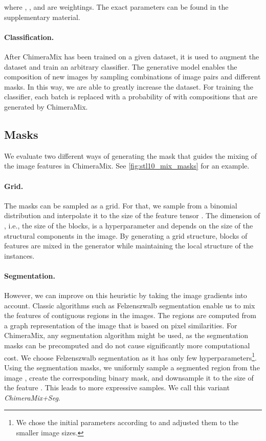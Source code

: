 \documentclass{article}
\newcommand{\methodname}{ChimeraMix\xspace}
\newcommand{\methodnameseg}{ChimeraMix+Seg\xspace}
\newcommand{\textcite}[1]{\citeauthor{#1}\xspace\shortcite{#1}}
\begin{document}
where , , and  are weightings.
The exact parameters can be found in the supplementary material. 


\paragraph{Classification.}
\label{par:classifier}

After \methodname has been trained on a given dataset, it is used to augment the dataset and train an arbitrary classifier. 
The generative model enables the composition of new images by sampling combinations of image pairs and different masks. 
In this way, we are able to greatly increase the dataset. 
For training the classifier, each batch is replaced with a probability of  with compositions that are generated by \methodname.

\subsection{Masks}
\label{subsec:masks}

We evaluate two different ways of generating the mask that guides the mixing of the image features in \methodname.
See \cref{fig:stl10_mix_masks} for an example.

\paragraph{Grid.}
\label{par:grid}

The masks can be sampled as a grid.
For that, we sample  from a binomial distribution  and interpolate it to the size of the feature tensor .
The dimension of , i.e., the size of the blocks, is a hyperparameter and depends on the size of the structural components in the image. 
By generating a grid structure, blocks of features are mixed in the generator while maintaining the local structure of the instances.

\paragraph{Segmentation.}
\label{par:segmentation_masks}

However, we can improve on this heuristic by taking the image gradients into account.
Classic algorithms such as Felzenszwalb segmentation \cite{felzenszwalbEfficientGraphBasedImage2004} enable us to mix the features of contiguous regions in the images.
The regions are computed from a graph representation of the image that is based on pixel similarities.
For \methodname, any segmentation algorithm might be used, as the segmentation masks can be precomputed and do not cause significantly more computational cost.
We choose Felzenszwalb segmentation as it has only few hyperparameters\footnote{We chose the initial parameters according to \textcite{henaffEfficientVisualPretraining2021} and adjusted them to the smaller image sizes.}.
Using the segmentation masks, we uniformly sample a segmented region from the image , create the corresponding binary mask, and downsample it to the size of the feature .
This leads to more expressive samples.
We call this variant \emph{\methodnameseg}.
\end{document}
